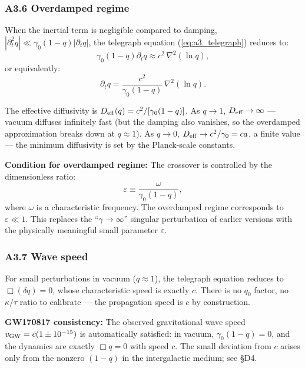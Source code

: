 \documentclass[reprint]{revtex4-2}
\begin{document}
\subsubsection{A3.6 Overdamped regime}

When the inertial term is negligible compared to damping, $|\partial_t^2 q| \ll \gamma_0(1-q)|\partial_t q|$, the telegraph equation (\ref{eq:a3_telegraph}) reduces to:
\begin{equation}
\gamma_0(1-q)\partial_t q \approx c^2\,\nabla^2(\ln q),
\end{equation}
or equivalently:
\begin{equation}
\boxed{\partial_t q = \frac{c^2}{\gamma_0(1-q)}\,\nabla^2(\ln q)}.
\label{eq:a3_overdamped}
\end{equation}

The effective diffusivity is $D_{\rm eff}(q) = c^2/[\gamma_0(1-q)]$. As $q\to 1$, $D_{\rm eff}\to\infty$ --- vacuum diffuses infinitely fast (but the damping also vanishes, so the overdamped approximation breaks down at $q\approx 1$). As $q\to 0$, $D_{\rm eff}\to c^2/\gamma_0 = ca$, a finite value --- the minimum diffusivity is set by the Planck-scale constants.

\textbf{Condition for overdamped regime:} The crossover is controlled by the dimensionless ratio:
\begin{equation}
\varepsilon \equiv \frac{\omega}{\gamma_0(1-q)},
\end{equation}
where $\omega$ is a characteristic frequency. The overdamped regime corresponds to $\varepsilon \ll 1$. This replaces the ``$\gamma\to\infty$'' singular perturbation of earlier versions with the physically meaningful small parameter $\varepsilon$.

\subsubsection{A3.7 Wave speed}

For small perturbations in vacuum ($q\approx 1$), the telegraph equation reduces to $\Box(\delta q)=0$, whose characteristic speed is exactly $c$. There is no $q_0$ factor, no $\kappa/\tau$ ratio to calibrate --- the propagation speed is $c$ by construction.

\textbf{GW170817 consistency:} The observed gravitational wave speed $v_{\rm GW} = c(1 \pm 10^{-15})$ is automatically satisfied: in vacuum, $\gamma_0(1-q)=0$, and the dynamics are exactly $\Box q=0$ with speed $c$. The small deviation from $c$ arises only from the nonzero $(1-q)$ in the intergalactic medium; see \S D4.
\end{document}
